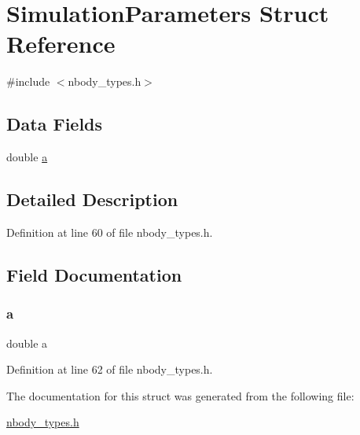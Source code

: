 \hypertarget{struct_simulation_parameters}{}\section{Simulation\+Parameters Struct Reference}
\label{struct_simulation_parameters}


{\ttfamily \#include $<$nbody\+\_\+types.\+h$>$}

\subsection*{Data Fields}
\begin{DoxyCompactItemize}
\item 
double \hyperlink{struct_simulation_parameters_a1031d0e0a97a340abfe0a6ab9e831045}{a}
\end{DoxyCompactItemize}


\subsection{Detailed Description}


Definition at line 60 of file nbody\+\_\+types.\+h.



\subsection{Field Documentation}
\hypertarget{struct_simulation_parameters_a1031d0e0a97a340abfe0a6ab9e831045}{}\label{struct_simulation_parameters_a1031d0e0a97a340abfe0a6ab9e831045} 
\subsubsection{\texorpdfstring{a}{a}}
{\footnotesize\ttfamily double a}



Definition at line 62 of file nbody\+\_\+types.\+h.



The documentation for this struct was generated from the following file\+:\begin{DoxyCompactItemize}
\item 
\hyperlink{nbody__types_8h}{nbody\+\_\+types.\+h}\end{DoxyCompactItemize}

